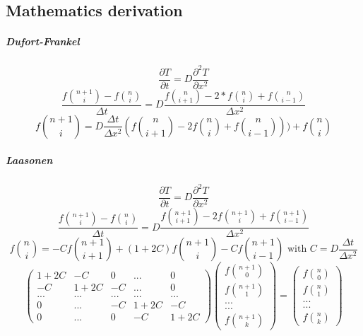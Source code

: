 \documentclass[12pt, a4paper]{report}
\begin{document}
\begin{appendix}
\clearpage
{}
\chapter{Mathematics derivation}
 
\paragraph{Dufort-Frankel}
\begin{equation}\frac{\partial T}{\partial t} = D\frac{\partial^2T }{\partial x^2}
\end{equation} 
\begin{equation}\frac{f\binom{n+1}{i} - f\binom{n}{i}}{\Delta t} = D\frac{f\binom{n}{i+1} - 2*f\binom{n}{i} +f\binom{n}{i-1}}{\Delta x^{2}}
\end{equation} 
\begin{equation}
f\binom{n+1}{i} = D\frac{\Delta t}{\Delta x^{2}}(f\binom{n}{i+1}-2f\binom{n}{i}+f\binom{n}{i-1}))+f\binom{n}{i}
\end{equation} 
\paragraph{Laasonen}
\begin{equation}\frac{\partial T}{\partial t} = D\frac{\partial^2T }{\partial x^2}
\end{equation} 
\begin{equation}\frac{f\binom{n+1}{i} - f\binom{n}{i}}{\Delta t} = D\frac{f\binom{n+1}{i+1} - 2f\binom{n+1}{i}+ f\binom{n+1}{i-1}}{\Delta x^{2}}
\end{equation} 
\begin{equation}f\binom{n}{i} = -Cf\binom{n+1}{i+1}+(1+2C)f\binom{n+1}{i}-Cf\binom{n+1}{i-1}
   \text{ with }
C = D\frac{\Delta t}{\Delta x^{2}}
\end{equation}
\begin{equation}
\begin{pmatrix}
1+2C & -C & 0 & ... & 0\\
-C & 1+2C & -C& ... & 0\\
...&...&...&...&...\\
 0 & ...& -C &1+2C & -C \\
0 & ... &  0& -C & 1+2C
\end{pmatrix}
\begin{pmatrix}
f\binom{n+1}{0}\\
f\binom{n+1}{1}\\
...\\
...\\
f\binom{n+1}{k}
\end{pmatrix}
=
\begin{pmatrix}
f\binom{n}{0}\\
f\binom{n}{1}\\
...\\
...\\
f\binom{n}{k}
\end{pmatrix}
\end{equation}

\end{appendix}
\end{document}
